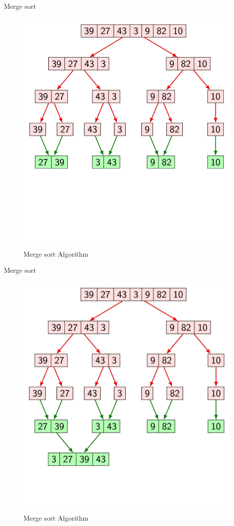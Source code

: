\documentclass{beamer}
\begin{document}
\begin{frame}{Merge sort}
	\begin{figure}[h]
		\centering
		\includegraphics[scale=0.24]{IKEHS12.jpg}
		\label{fig:2}
		\caption{Merge sort Algorithm}
	\end{figure}
\end{frame}

\begin{frame}{Merge sort}
	\begin{figure}[h]
		\centering
		\includegraphics[scale=0.24]{IKEHS13.jpg}
		\label{fig:2}
		\caption{Merge sort Algorithm}
	\end{figure}
\end{frame}
\end{document}
